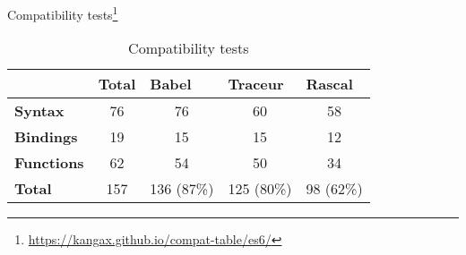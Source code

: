 Compatibility tests\footnote{\url{https://kangax.github.io/compat-table/es6/}}
\begin{table}[h]
\centering
\caption{Compatibility tests}
\label{my-label}
\begin{tabular}{@{}lcccc@{}}
\toprule
                & {\bf Total} & \multicolumn{1}{l}{{\bf Babel}} & \multicolumn{1}{l}{{\bf Traceur}} & \multicolumn{1}{l}{{\bf Rascal}} \\ \midrule
{\bf Syntax}    & 76          & 76                              & 60                                & 58                               \\
{\bf Bindings}  & 19          & 15                              & 15                                & 12                               \\
{\bf Functions} & 62          & 54                              & 50                                & 34                               \\
{\bf Total}     & 157         & 136 (87\%)                      & 125 (80\%)                        & 98 (62\%)                        \\ \bottomrule
\end{tabular}
\end{table}
